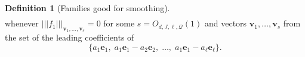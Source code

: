 \documentclass[11pt]{amsart}
\theoremstyle{definition}
\newtheorem{definition}[lemma]{Definition}
\newcommand{\R}{{\mathbb R}}
\newcommand{\CD}{{\mathcal D}}
\newcommand{\CQ}{{\mathcal Q}}
\newcommand{\FD}{{\mathfrak D}}
\newcommand{\be}{{\mathbf{e}}}
\newcommand{\bv}{{\mathbf{v}}}
\newcommand{\nnorm}[1]{\lvert\!|\!| #1|\!|\!\rvert}
\newcommand{\1}{{\mathbf{1}}}
\begin{document}
\begin{definition}[Families good for smoothing]
\begin{align}
    \end{align}
    whenever $\nnorm{f_1}_{\bv_{1},\dots,\bv_{s}}=0$
    for some $s = O_{d,J,\ell, \CQ}(1)$ and vectors $\bv_1, \ldots, \bv_s$ from the set of the leading coefficients of %
    $$\{a_1 \be_1,\; a_1 \be_1 - a_2 \be_2,\; \ldots,\; a_1 \be_1 - a_\ell \be_\ell\}.$$
    \end{definition}
\end{document}
